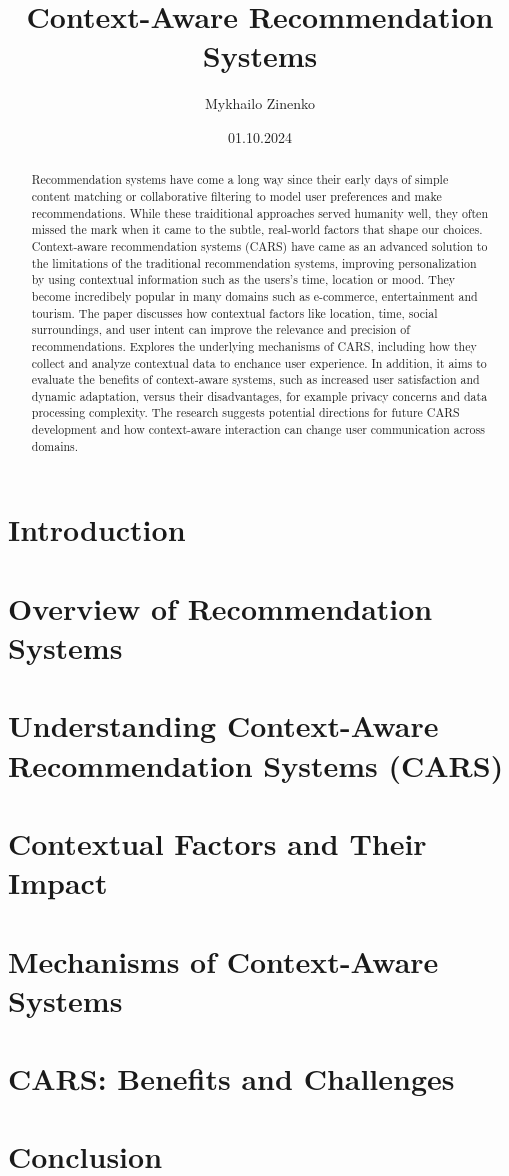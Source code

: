 \documentclass[11pt]{article} %
\title{Context-Aware Recommendation Systems}
\author{Mykhailo Zinenko}
\date{01.10.2024} %
\begin{document}
\maketitle

\begin{abstract}
Recommendation systems have come a long way since their early days of simple content matching or collaborative filtering to model user preferences and make recommendations. While these traiditional approaches served humanity well, they often missed the mark when it came to the subtle, real-world factors that shape our choices. Context-aware recommendation systems (CARS) have came as an advanced solution to the limitations of the traditional recommendation systems, improving personalization by using contextual information such as the users's time, location or mood. They become incredibely popular in many domains such as e-commerce, entertainment and tourism. The paper discusses how contextual factors like location, time, social surroundings, and user intent can improve the relevance and precision of recommendations. Explores the underlying mechanisms of CARS, including how they collect and analyze contextual data to enchance user experience. In addition, it aims to evaluate the benefits of context-aware systems, such as increased user satisfaction and dynamic adaptation, versus their disadvantages, for example privacy concerns and data processing complexity. The research suggests potential directions for future CARS development and how context-aware interaction can change user communication across domains. \cite{CARRIZO2017194}\cite{KULKARNI2020100255}
\end{abstract}

\section{Introduction}

\section{Overview of Recommendation Systems}

\section{Understanding Context-Aware Recommendation Systems (CARS)}

\section{Contextual Factors and Their Impact}

\section{Mechanisms of Context-Aware Systems}

\section{CARS: Benefits and Challenges}

\section{Conclusion}



\end{document}
